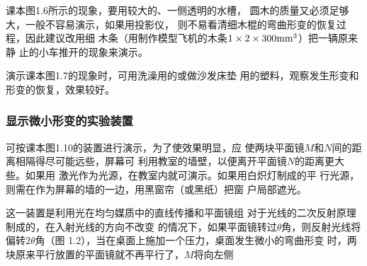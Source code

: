 课本图1.6所示的现象，要用较大的、一侧透明的水槽，
圆木的质量又必须足够大，一般不容易演示，如果用投影仪，
则不易看清细木棍的弯曲形变的恢复过程，因此建议改用细
木条（用制作模型飞机的木条$1\times2\times300 {\rm mm}^3$）把一辆原来静
止的小车推开的现象来演示。

演示课本图1.7的现象时，可用洗澡用的或做沙发床垫
用的塑料，观察发生形变和形变的恢复，效果较好。

\subsubsection{显示微小形变的实验装置}
可按课本图1.10的装置进行演示，为了使效果明显，应
使两块平面镜$M$和$N$间的距离相隔得尽可能远些，屏幕可
利用教室的墙壁，以便离开平面镜$N$的距离更大些。如果用
激光作为光源，在教室内就可演示。如果用白炽灯制成的平
行光源，则需在作为屏幕的墙的一边，用黑窗帘（或黑纸）把窗
户局部遮光。

这一装置是利用光在均匀媒质中的直线传播和平面镜组
对于光线的二次反射原理制成的，在入射光线的方向不改变
的情况下，如果平面镜转过$\theta$角，则反射光线将偏转$2\theta$角（图
1.2），当在桌面上施加一个压力，桌面发生微小的弯曲形变
时，两块原来平行放置的平面镜就不再平行了，$M$将向左侧















